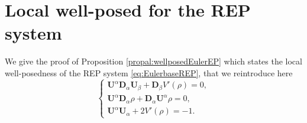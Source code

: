 \documentclass[a4paper, 15pt]{article}
\numberwithin{equation}{section}
\begin{document}
\section{Local well-posed for the REP system}
\label{section:appendix2}
We give the proof of Proposition \ref{propal:wellposedEulerEP} which states the local well-posedness of the REP system \eqref{eq:EulerbaseREP}, that we reintroduce here 
\begin{equation}
\label{eq:EulerbaseREPap}
\begin{cases}
\textbf{U}^\alpha\textbf{D}_\alpha \textbf{U}_\beta+\textbf{D}_\beta V'(\rho)=0,\\
\textbf{U}^\alpha\textbf{D}_\alpha \rho+\textbf{D}_\alpha \textbf{U}^\alpha\rho=0,\\
\textbf{U}^\alpha \textbf{U}_\alpha+2V'(\rho)=-1.
\end{cases}
\end{equation}
\end{document}
